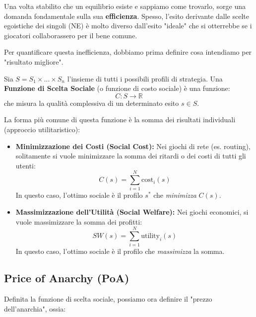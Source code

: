 Una volta stabilito che un equilibrio esiste e sappiamo come trovarlo, sorge una domanda fondamentale sulla sua \textbf{efficienza}.
Spesso, l'esito derivante dalle scelte egoistiche dei singoli (NE) è molto diverso dall'esito "ideale" che si otterrebbe se i giocatori collaborassero per il bene comune.

Per quantificare questa inefficienza, dobbiamo prima definire cosa intendiamo per "risultato migliore".

\begin{definizione}
Sia $S = S_1 \times \dots \times S_n$ l'insieme di tutti i possibili profili di strategia. Una \textbf{Funzione di Scelta Sociale} (o funzione di costo sociale) è una funzione:
\[
C: S \to \mathbb{R}
\]
che misura la qualità complessiva di un determinato esito $s \in S$.
\end{definizione}

La forma più comune di questa funzione è la somma dei risultati individuali (approccio utilitaristico):

\begin{itemize}
    \item \textbf{Minimizzazione dei Costi (Social Cost):}
    Nei giochi di rete (es. routing), solitamente si vuole minimizzare la somma dei ritardi o dei costi di tutti gli utenti:
    \[
    C(s) = \sum_{i=1}^{N} \text{cost}_i(s)
    \]
    In questo caso, l'ottimo sociale è il profilo $s^*$ che \textit{minimizza} $C(s)$.

    \item \textbf{Massimizzazione dell'Utilità (Social Welfare):}
    Nei giochi economici, si vuole massimizzare la somma dei profitti:
    \[
    SW(s) = \sum_{i=1}^{N} \text{utility}_i(s)
    \]
    In questo caso, l'ottimo sociale è il profilo che \textit{massimizza} la somma.
\end{itemize}

\newpage

\subsection{Price of Anarchy (PoA)}

Definita la funzione di scelta sociale, possiamo ora definire il "prezzo dell'anarchia", ossia:

